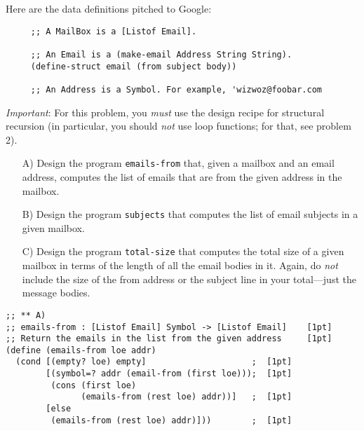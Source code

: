 \documentclass[12pt]{article}                   %
\def\pts#1{\marginpar{\footnotesize \raggedright  \fbox{#1 {\sc Points}}}}
\newenvironment{solution}{}{}
\begin{document}
\newpage
\begin{problem}\pts{16}
\noindent Here are the data definitions pitched to Google:
\begin{verbatim}
     ;; A MailBox is a [Listof Email].

     ;; An Email is a (make-email Address String String).
     (define-struct email (from subject body))

     ;; An Address is a Symbol. For example, 'wizwoz@foobar.com
\end{verbatim}

\smallskip

\noindent
\textit{Important}: For this problem, you \textit{must} use the
design recipe for structural recursion (in particular, you should
\emph{not} use loop functions; for that, see problem 2).

\begin{itemize}
\item[A)\;] Design the program \texttt{emails-from} that, given a
  mailbox and an email address, computes the list of emails that are
  from the given address in the mailbox.

\item[B)\;] Design the program \texttt{subjects} that
computes the list of email subjects in a given mailbox.

\item[C)\;] Design the program \texttt{total-size} that computes
  the total size of a given mailbox in terms of the length of all the
  email bodies in it.
  Again, do \emph{not} include the size of the from address or the subject
    line in your total---just the message bodies.

\end{itemize}

\newpage
\ifrubric{}
\newpage
\fi

\begin{solution}
\begin{verbatim}
;; ** A)
;; emails-from : [Listof Email] Symbol -> [Listof Email]    [1pt]
;; Return the emails in the list from the given address     [1pt]
(define (emails-from loe addr)
  (cond [(empty? loe) empty]                     ;  [1pt]
        [(symbol=? addr (email-from (first loe)));  [1pt]
         (cons (first loe)
               (emails-from (rest loe) addr))]   ;  [1pt]
        [else
         (emails-from (rest loe) addr)]))        ;  [1pt]


\end{verbatim}
\end{solution}
\end{problem}
\end{document}
